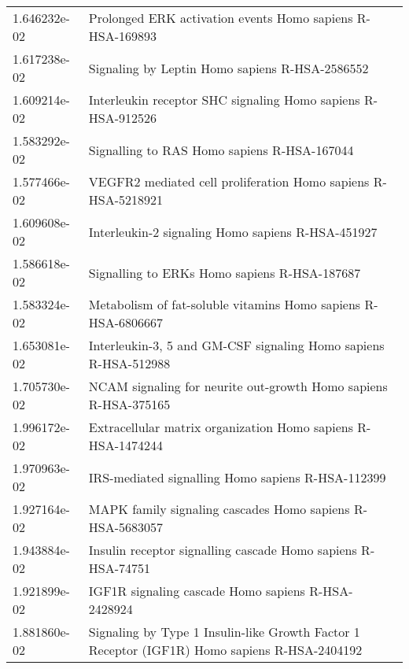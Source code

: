 \begin{longtable}{p{2.4cm}p{14.5cm}}
             1.646232e-02 &                                     Prolonged ERK activation events Homo sapiens R-HSA-169893 \\
             1.617238e-02 &                                                Signaling by Leptin Homo sapiens R-HSA-2586552 \\
             1.609214e-02 &                                  Interleukin receptor SHC signaling Homo sapiens R-HSA-912526 \\
             1.583292e-02 &                                                   Signalling to RAS Homo sapiens R-HSA-167044 \\
             1.577466e-02 &                                 VEGFR2 mediated cell proliferation Homo sapiens R-HSA-5218921 \\
             1.609608e-02 &                                             Interleukin-2 signaling Homo sapiens R-HSA-451927 \\
             1.586618e-02 &                                                  Signalling to ERKs Homo sapiens R-HSA-187687 \\
             1.583324e-02 &                                 Metabolism of fat-soluble vitamins Homo sapiens R-HSA-6806667 \\
             1.653081e-02 &                               Interleukin-3, 5 and GM-CSF signaling Homo sapiens R-HSA-512988 \\
             1.705730e-02 &                               NCAM signaling for neurite out-growth Homo sapiens R-HSA-375165 \\
             1.996172e-02 &                                  Extracellular matrix organization Homo sapiens R-HSA-1474244 \\
             1.970963e-02 &                                             IRS-mediated signalling Homo sapiens R-HSA-112399 \\
             1.927164e-02 &                                     MAPK family signaling cascades Homo sapiens R-HSA-5683057 \\
             1.943884e-02 &                                  Insulin receptor signalling cascade Homo sapiens R-HSA-74751 \\
             1.921899e-02 &                                            IGF1R signaling cascade Homo sapiens R-HSA-2428924 \\
             1.881860e-02 &  Signaling by Type 1 Insulin-like Growth Factor 1 Receptor (IGF1R) Homo sapiens R-HSA-2404192 \\

\end{longtable}
